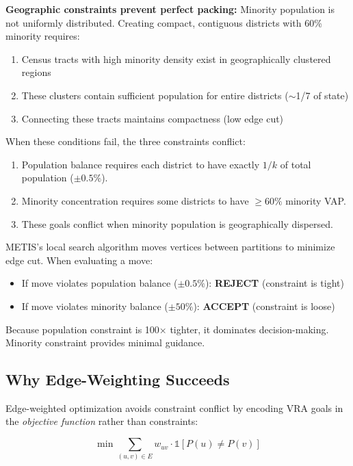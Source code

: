 \textbf{Geographic constraints prevent perfect packing:} Minority population is not uniformly distributed. Creating compact, contiguous districts with 60\% minority requires:
\begin{enumerate}
    \item Census tracts with high minority density exist in geographically clustered regions
    \item These clusters contain sufficient population for entire districts ($\sim$1/7 of state)
    \item Connecting these tracts maintains compactness (low edge cut)
\end{enumerate}

When these conditions fail, the three constraints conflict:
\begin{enumerate}
    \item Population balance requires each district to have exactly $1/k$ of total population ($\pm0.5\%$).
    \item Minority concentration requires some districts to have $\geq60\%$ minority VAP.
    \item These goals conflict when minority population is geographically dispersed.
\end{enumerate}

METIS's local search algorithm moves vertices between partitions to minimize edge cut. When evaluating a move:
\begin{itemize}
    \item If move violates population balance ($\pm0.5\%$): \textbf{REJECT} (constraint is tight)
    \item If move violates minority balance ($\pm50\%$): \textbf{ACCEPT} (constraint is loose)
\end{itemize}

Because population constraint is 100× tighter, it dominates decision-making. Minority constraint provides minimal guidance.

\subsection{Why Edge-Weighting Succeeds}

Edge-weighted optimization avoids constraint conflict by encoding VRA goals in the \textit{objective function} rather than constraints:

\begin{equation}
\min \sum_{(u,v) \in E} w_{uv} \cdot \mathbb{1}[P(u) \neq P(v)]
\end{equation}

